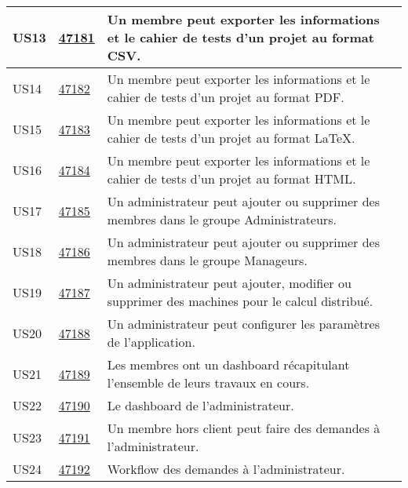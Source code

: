 \begin{center}
\begin{tabular}{|l|p{1.5cm}|p{14cm}|}
        \hline
US13	&	\href{https://redmine-projets.smile.fr/issues/47181}{47181}	&	Un membre peut exporter les informations et le cahier de tests d'un projet au format CSV.	                        \\
        \hline
US14	&	\href{https://redmine-projets.smile.fr/issues/47182}{47182}	&	Un membre peut exporter les informations et le cahier de tests d'un projet au format PDF.	                    \\
        \hline
US15	&	\href{https://redmine-projets.smile.fr/issues/47183}{47183}	&	Un membre peut exporter les informations et le cahier de tests d'un projet au format \LaTeX{}.	                \\
        \hline
US16	&	\href{https://redmine-projets.smile.fr/issues/47184}{47184}	&	Un membre peut exporter les informations et le cahier de tests d'un projet au format HTML.	                    \\
        \hline
US17	&	\href{https://redmine-projets.smile.fr/issues/47185}{47185}	&	Un administrateur peut ajouter ou supprimer des membres dans le groupe Administrateurs.	        \\
        \hline
US18	&	\href{https://redmine-projets.smile.fr/issues/47186}{47186}	&	Un administrateur peut ajouter ou supprimer des membres dans le groupe Manageurs.	            \\
        \hline
US19	&	\href{https://redmine-projets.smile.fr/issues/47187}{47187}	&	Un administrateur peut ajouter, modifier ou supprimer des machines pour le calcul distribué.	\\
        \hline
US20	&	\href{https://redmine-projets.smile.fr/issues/47188}{47188}	&	Un administrateur peut configurer les paramètres de l'application.	                                \\
        \hline
US21	&	\href{https://redmine-projets.smile.fr/issues/47189}{47189}	&	Les membres ont un dashboard récapitulant l'ensemble de leurs travaux en cours.	                \\
        \hline
US22	&	\href{https://redmine-projets.smile.fr/issues/47190}{47190}	&	Le dashboard de l'administrateur.	                                                            \\
        \hline
US23	&	\href{https://redmine-projets.smile.fr/issues/47191}{47191}	&	Un membre hors client peut faire des demandes à l'administrateur.	                            \\
        \hline
US24	&	\href{https://redmine-projets.smile.fr/issues/47192}{47192}	&	Workflow des demandes à l'administrateur.	                                                    \\

\end{tabular}
\end{center}
